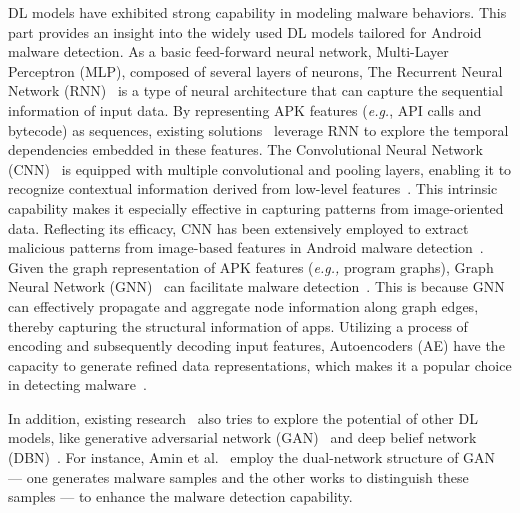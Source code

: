 DL models have exhibited strong capability in modeling malware behaviors. 
This part provides an insight into the widely used DL models tailored for Android malware detection.
As a basic feed-forward neural network, Multi-Layer Perceptron (MLP), composed of several layers of neurons, 
The Recurrent Neural Network (RNN)~\cite{medsker2001recurrent} is a type of neural architecture that can capture the sequential information of input data.
By representing APK features (\textit{e.g.}, API calls and bytecode) as sequences, existing solutions~\cite{xu2018deeprefiner,yan2018lstm,vinayakumar2017deep} leverage RNN to explore the temporal dependencies embedded in these features.
The Convolutional Neural Network (CNN)~\cite{he2017mask} is equipped with multiple convolutional and pooling layers, enabling it to recognize contextual information derived from low-level features~\cite{girshick2015fast}.
This intrinsic capability makes it especially effective in capturing patterns from image-oriented data.
Reflecting its efficacy, CNN has been extensively employed to extract malicious patterns from image-based features in Android malware detection~\cite{mclaughlin2017deep,hsien2018r2,feng2019mobidroid,karbab2018maldozer,huang2019deep,he2019malware}.
Given the graph representation of APK features (\textit{e.g.,} program graphs), Graph Neural Network (GNN)~\cite{kipf2016semi} can facilitate malware detection~\cite{he2022msdroid,mariconti2016mamadroid,gao2021gdroid,fan2021heterogeneous}.
This is because GNN can effectively propagate and aggregate node information along graph edges, thereby capturing the structural information of apps.
Utilizing a process of encoding and subsequently decoding input features, Autoencoders (AE) have the capacity to generate refined data representations, which makes it a popular choice in detecting malware~\cite{li2021robust,yang2021cade,zhu2021hybrid}.

In addition, existing research~\cite{su2016deep,wang2020sedroid,amin2022android} also tries to explore the potential of other DL models, like generative adversarial network (GAN)~\cite{goodfellow2014generative} and deep belief network (DBN)~\cite{hinton2009deep}.
For instance, Amin et al.~\cite{amin2022android} employ the dual-network structure of GAN --- one generates malware samples and the other works to distinguish these samples --- to enhance the malware detection capability.


